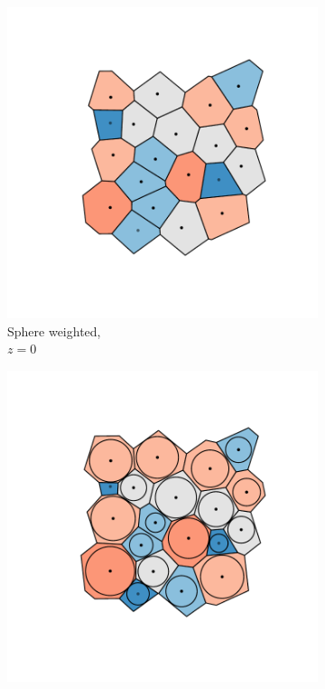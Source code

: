 \begin{figure}[tb]
	\centering
     
      \begin{subfigure}[b]{0.23\textwidth}
         \centering
         \includegraphics[width=\textwidth]{./figures/quasi2d/cut_z0_a.pdf}
         \caption{Sphere weighted, \\$z=0$}
         \label{fig:cut0a}
     \end{subfigure}
     \hfill
      \begin{subfigure}[b]{0.23\textwidth}
         \centering
         \includegraphics[width=\textwidth]{./figures/quasi2d/cut_z10_a.pdf}

\end{subfigure}
\end{figure}
